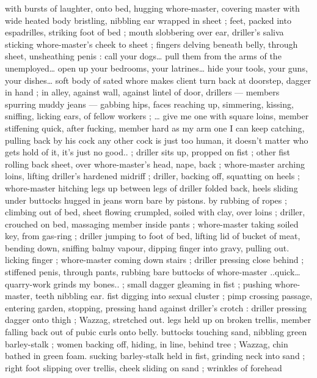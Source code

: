 with bursts of laughter, onto bed, hugging whore-master, covering 
master with wide heated body bristling, nibbling ear wrapped in sheet 
; feet, packed into espadrilles, striking foot of bed ; mouth 
slobbering over ear, driller's saliva sticking whore-master's cheek to 
sheet ; fingers delving beneath belly, through sheet, unsheathing 
penis :{\td} {\gl} call your dogs{\ldots} pull them from the arms of the 
unemployed{\ldots} open up your bedrooms, your latrines{\ldots} hide your 
tools, your guns, your dishes{\ldots} soft body of sated whore makes 
client turn back at doorstep, dagger in hand{\td} {\gr} ; in alley, against wall, 
against lintel of door, drillers --- members spurring muddy jeans --- 
gabbing hips, faces reaching up, simmering, kissing, sniffing, licking 
ears, of fellow workers ; {\ldots} {\gl}{\td} give me one with square loins, member 
stiffening quick, after fucking, member hard as my arm{\td} one I can 
keep catching, pulling back by his cock{\td} any other cock is just too 
human, it doesn't matter who gets hold of it, it's just no good..{\gr} ; 
driller sits up, propped on fist ; other fist rolling back sheet, over 
whore-master's head, nape, back ; whore-master arching loins, lifting 
driller's hardened midriff ; driller, backing off, squatting on heels ; 
whore-master hitching legs up between legs of driller folded back, 
heels sliding under buttocks hugged in jeans worn bare by pistons. 
by rubbing of ropes ; climbing out of bed, sheet flowing crumpled, 
soiled with clay, over loins ; driller, crouched on bed, massaging 
member inside pants ; whore-master taking soiled key, from gas-ring 
; driller jumping to foot of bed, lifting lid of bucket of meat, bending 
down, sniffing balmy vapour, dipping finger into gravy, pulling out. 
licking finger ; whore-master coming down stairs ; driller pressing 
close behind ; stiffened penis, through pants, rubbing bare buttocks 
of whore-master{\td} {\gl}..quick{\ldots} quarry-work grinds my bones..{\gr} ; small 
dagger gleaming in fist ; pushing whore-master, teeth nibbling ear. 
fist digging into sexual cluster ; pimp crossing passage, entering 
garden, stopping, pressing hand against driller's crotch : driller 
pressing dagger onto thigh ; Wazzag, stretched out. legs held up on 
broken trellis, member falling back out of pubic curls onto belly. 
buttocks touching sand, nibbling green barley-stalk ; women backing 
off, hiding, in line, behind tree ; Wazzag, chin bathed in green foam. 
sucking barley-stalk held in fist, grinding neck into sand ; right foot 
slipping over trellis, cheek sliding on sand ; wrinkles of forehead 
